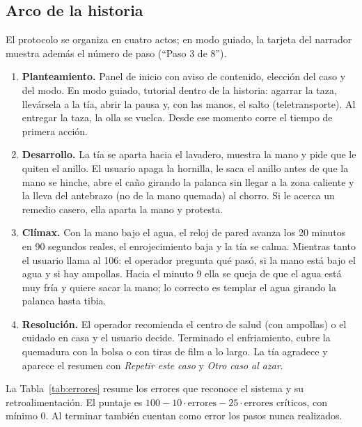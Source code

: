\documentclass[11pt,a4paper]{article}
\begin{document}
\subsection{Arco de la historia}
El protocolo se organiza en cuatro actos; en modo guiado, la tarjeta del narrador muestra además el número de paso (``Paso 3 de 8'').
\begin{enumerate}
    \item \textbf{Planteamiento.} Panel de inicio con aviso de contenido, elección del caso y del modo. En modo guiado, tutorial dentro de la historia: agarrar la taza, llevársela a la tía, abrir la pausa y, con las manos, el salto (teletransporte). Al entregar la taza, la olla se vuelca. Desde ese momento corre el tiempo de primera acción.
    \item \textbf{Desarrollo.} La tía se aparta hacia el lavadero, muestra la mano y pide que le quiten el anillo. El usuario apaga la hornilla, le saca el anillo antes de que la mano se hinche, abre el caño girando la palanca sin llegar a la zona caliente y la lleva del antebrazo (no de la mano quemada) al chorro. Si le acerca un remedio casero, ella aparta la mano y protesta.
    \item \textbf{Clímax.} Con la mano bajo el agua, el reloj de pared avanza los 20 minutos en 90 segundos reales, el enrojecimiento baja y la tía se calma. Mientras tanto el usuario llama al 106: el operador pregunta qué pasó, si la mano está bajo el agua y si hay ampollas. Hacia el minuto 9 ella se queja de que el agua está muy fría y quiere sacar la mano; lo correcto es templar el agua girando la palanca hasta tibia.
    \item \textbf{Resolución.} El operador recomienda el centro de salud (con ampollas) o el cuidado en casa y el usuario decide. Terminado el enfriamiento, cubre la quemadura con la bolsa o con tiras de film a lo largo. La tía agradece y aparece el resumen con \textit{Repetir este caso} y \textit{Otro caso al azar}.
\end{enumerate}

La Tabla~\ref{tab:errores} resume los errores que reconoce el sistema y su retroalimentación. El puntaje es \(100 - 10 \cdot \text{errores} - 25 \cdot \text{errores críticos}\), con mínimo 0. Al terminar también cuentan como error los pasos nunca realizados.
\end{document}
